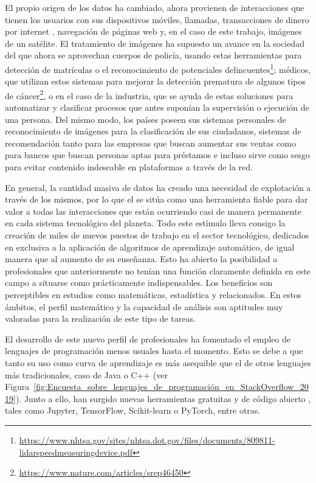 El propio origen de los datos ha cambiado, ahora provienen de interacciones que tienen los usuarios con sus dispositivos móviles, llamadas, transacciones de dinero por internet \cite{crypto}, navegación de páginas web y, en el caso de este trabajo, imágenes de un satélite.
El tratamiento de imágenes ha supuesto un avance en la sociedad del que ahora se aprovechan cuerpos de policía, usando estas herramientas para detección de matrículas o el reconocimiento de potenciales delincuentes\footnote{\url{https://www.nhtsa.gov/sites/nhtsa.dot.gov/files/documents/809811-lidarspeedmeasuringdevice.pdf}}; médicos, que utilizan estos sistemas \cite{medic} para mejorar la detección prematura de algunos tipos de cáncer\footnote{\url{https://www.nature.com/articles/srep46450}}, o en el caso de la industria, que se ayuda de estas soluciones para automatizar y clasificar procesos que antes suponían la supervisión o ejecución de una persona.
Del mismo modo, los países poseen sus sistemas personales de reconocimiento de imágenes para la clasificación de sus ciudadanos, sistemas de recomendación tanto para las empresas que buscan aumentar sus ventas como para bancos que buscan personas aptas para préstamos e incluso sirve como sesgo para evitar contenido indeseable en plataformas a través de la red.


En general, la cantidad masiva de datos ha creado una necesidad de explotación a
través de los mismos, por lo que el  se sitúa como una herramienta fiable para dar valor a todas las interacciones que están ocurriendo casi de manera permanente
en cada sistema tecnológico del planeta.
Todo este estímulo lleva consigo la creación de miles de nuevos puestos de trabajo en el sector tecnológico, dedicados en exclusiva a la aplicación de algoritmos de aprendizaje automático, de igual manera que al aumento de su enseñanza.
Esto ha abierto la posibilidad a profesionales que anteriormente no tenían una función claramente definida en este campo a situarse como prácticamente indispensables.
Los beneficios son perceptibles en estudios como matemáticas, estadística y relacionados. En estos ámbitos, el perfil matemático y la capacidad de análisis son aptitudes muy valoradas para la realización de este tipo de tareas.

El desarrollo de este nuevo perfil de profesionales ha fomentado el empleo de lenguajes de programación menos usuales hasta el momento. Esto se debe a que tanto su uso como curva de aprendizaje es más asequible que el de otros lenguajes más tradicionales, caso de Java o C++ (ver Figura~\ref{fig:Encuesta_sobre_lenguajes_de_programación_en_StackOverflow_2019}). Junto a ello, han surgido nuevas herramientas  gratuitas y de código abierto \cite{open}, tales como Jupyter, TensorFlow, Scikit-learn o PyTorch, entre otras.


